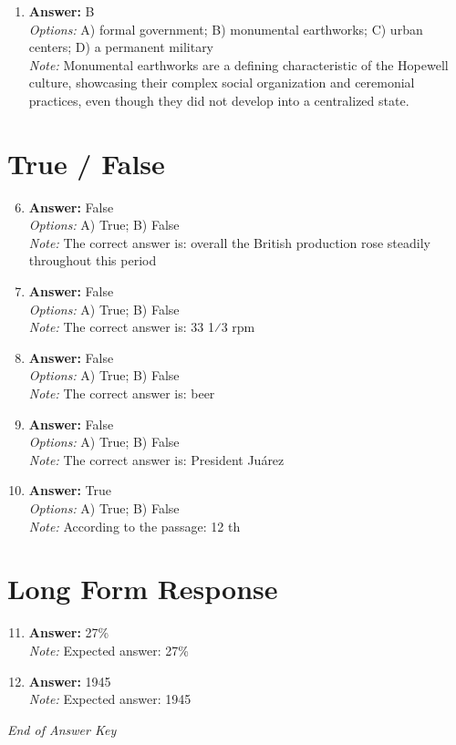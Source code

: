 \documentclass[12pt]{article}
\begin{document}
\begin{enumerate}[label=\arabic*.]
\\ \textit{Note:} Carbon-14 and uranium series dating are correct because both methods involve measuring the decay of isotopes that have accumulated energy from their radioactive parent materials, providing a means to date archaeological artifacts and sites based on their thermal history.
\item \textbf{Answer:} B
\\ \textit{Options:} A) formal government; B) monumental earthworks; C) urban centers; D) a permanent military
\\ \textit{Note:} Monumental earthworks are a defining characteristic of the Hopewell culture, showcasing their complex social organization and ceremonial practices, even though they did not develop into a centralized state.
\end{enumerate}

\section*{True / False}
\begin{enumerate}[label=\arabic*.]
\setcounter{enumi}{5}
\item \textbf{Answer:} False
\\ \textit{Options:} A) True; B) False
\\ \textit{Note:} The correct answer is: overall the British production rose steadily throughout this period
\item \textbf{Answer:} False
\\ \textit{Options:} A) True; B) False
\\ \textit{Note:} The correct answer is: 33 1⁄3 rpm
\item \textbf{Answer:} False
\\ \textit{Options:} A) True; B) False
\\ \textit{Note:} The correct answer is: beer
\item \textbf{Answer:} False
\\ \textit{Options:} A) True; B) False
\\ \textit{Note:} The correct answer is: President Juárez
\item \textbf{Answer:} True
\\ \textit{Options:} A) True; B) False
\\ \textit{Note:} According to the passage: 12 th
\end{enumerate}

\section*{Long Form Response}
\begin{enumerate}[label=\arabic*.]
\setcounter{enumi}{10}
\item \textbf{Answer:} 27\%
\\ \textit{Note:} Expected answer: 27\%
\item \textbf{Answer:} 1945
\\ \textit{Note:} Expected answer: 1945
\end{enumerate}

\vfill
\noindent\textit{End of Answer Key}
\end{document}
